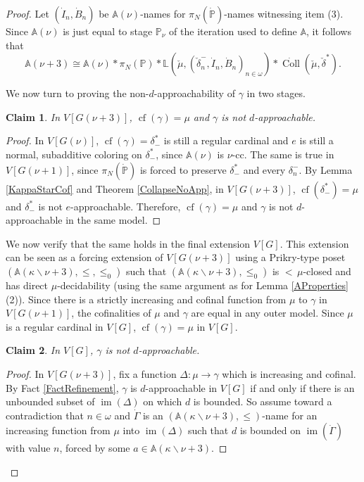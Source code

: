 \documentclass[a4paper]{amsart}
\theoremstyle{definition}
\theoremstyle{remark}
\theoremstyle{plain}
\newtheorem{myclaim}{Claim}
\numberwithin{mydef}{section}
\DeclareMathOperator{\im}{im}
\DeclareMathOperator{\cf}{cf}
\DeclareMathOperator{\Coll}{Coll}
\newcommand{\dA}{\mathbb{A}}
\newcommand{\dL}{\mathbb{L}}
\newcommand{\dP}{\mathbb{P}}
\begin{document}
\begin{proof}
		Let $(\dot{I}_n,\dot{B}_n)$ be $\dA(\nu)$-names for $\pi_N(\dot{\dP})$-names witnessing item (3). Since $\dA(\nu)$ is just equal to stage $\dP_{\nu}$ of the iteration used to define $\dA$, it follows that
		$$\dA(\nu+3)\cong\dA(\nu)*\pi_N(\dP)*\dL(\check{\mu},(\check{\delta}_n^-,\dot{I}_n,\dot{B}_n)_{n\in\omega})*\dot{\Coll}(\check{\mu},\check{\delta}^*).$$
		
		We now turn to proving the non-$d$-approachability of $\gamma$ in two stages.
		
		\begin{myclaim}\label{AClaim2}
			In $V[G(\nu+3)]$, $\cf(\gamma)=\mu$ and $\gamma$ is not $d$-approachable.
		\end{myclaim}
		
		\begin{proof}
			In $V[G(\nu)]$, $\cf(\gamma)=\delta_-^*$ is still a regular cardinal and $e$ is still a normal, subadditive coloring on $\delta_-^*$, since $\dA(\nu)$ is $\nu$-cc. The same is true in $V[G(\nu+1)]$, since $\pi_N(\dot{\dP})$ is forced to preserve $\delta_-^*$ and every $\delta_n^-$. By Lemma \ref{KappaStarCof} and Theorem \ref{CollapseNoApp}, in $V[G(\nu+3)]$, $\cf(\delta_-^*)=\mu$ and $\delta_-^*$ is not $e$-approachable. Therefore, $\cf(\gamma)=\mu$ and $\gamma$ is not $d$-approachable in the same model.
		\end{proof}
		
		We now verify that the same holds in the final extension $V[G]$. This extension can be seen as a forcing extension of $V[G(\nu+3)]$ using a Prikry-type poset $(\dA(\kappa\smallsetminus\nu+3),\leq,\leq_0)$ such that $(\dA(\kappa\smallsetminus\nu+3),\leq_0)$ is ${<}\,\mu$-closed and has direct $\mu$-decidability (using the same argument as for Lemma \ref{AProperties} (2)). Since there is a strictly increasing and cofinal function from $\mu$ to $\gamma$ in $V[G(\nu+1)]$, the cofinalities of $\mu$ and $\gamma$ are equal in any outer model. Since $\mu$ is a regular cardinal in $V[G]$, $\cf(\gamma)=\mu$ in $V[G]$.
		
		\begin{myclaim}
			In $V[G]$, $\gamma$ is not $d$-approachable.
		\end{myclaim}
		
		\begin{proof}
			In $V[G(\nu+3)]$, fix a function $\Delta\colon\mu\to\gamma$ which is increasing and cofinal. By Fact \ref{FactRefinement}, $\gamma$ is $d$-approachable in $V[G]$ if and only if there is an unbounded subset of $\im(\Delta)$ on which $d$ is bounded. So assume toward a contradiction that $n\in\omega$ and $\dot{\Gamma}$ is an $(\dA(\kappa\smallsetminus\nu+3),\leq)$-name for an increasing function from $\mu$ into $\im(\Delta)$ such that $d$ is bounded on $\im(\dot{\Gamma})$ with value $n$, forced by some $a\in\dA(\kappa\smallsetminus\nu+3)$.
			

\end{proof}
\end{proof}
\end{document}
